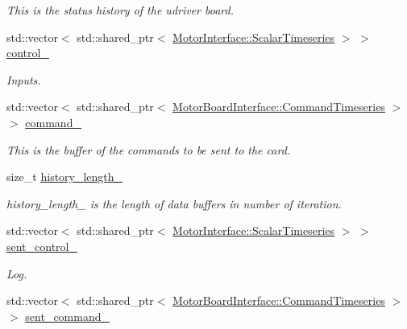 \begin{DoxyCompactItemize}
\begin{DoxyCompactList}\small\item\em This is the status history of the udriver board. \end{DoxyCompactList}\item 
std\+::vector$<$ std\+::shared\+\_\+ptr$<$ \hyperlink{classblmc__drivers_1_1MotorInterface_a49b8fc916b9f9debbd7b0988463db5cd}{Motor\+Interface\+::\+Scalar\+Timeseries} $>$ $>$ \hyperlink{classblmc__drivers_1_1SpiBus_a39d0629b2cb78b7aeae9a4022ca487ed}{control\+\_\+}
\begin{DoxyCompactList}\small\item\em Inputs. \end{DoxyCompactList}\item 
std\+::vector$<$ std\+::shared\+\_\+ptr$<$ \hyperlink{classblmc__drivers_1_1MotorBoardInterface_ae2afe94a023d9f08a4c689e9b7660f15}{Motor\+Board\+Interface\+::\+Command\+Timeseries} $>$ $>$ \hyperlink{classblmc__drivers_1_1SpiBus_a0dadae58644afb41beba8df8f9f09727}{command\+\_\+}\hypertarget{classblmc__drivers_1_1SpiBus_a0dadae58644afb41beba8df8f9f09727}{}\label{classblmc__drivers_1_1SpiBus_a0dadae58644afb41beba8df8f9f09727}

\begin{DoxyCompactList}\small\item\em This is the buffer of the commands to be sent to the card. \end{DoxyCompactList}\item 
size\+\_\+t \hyperlink{classblmc__drivers_1_1SpiBus_a8d0b70b8d02c386d436051a571930c58}{history\+\_\+length\+\_\+}\hypertarget{classblmc__drivers_1_1SpiBus_a8d0b70b8d02c386d436051a571930c58}{}\label{classblmc__drivers_1_1SpiBus_a8d0b70b8d02c386d436051a571930c58}

\begin{DoxyCompactList}\small\item\em history\+\_\+length\+\_\+ is the length of data buffers in number of iteration. \end{DoxyCompactList}\item 
std\+::vector$<$ std\+::shared\+\_\+ptr$<$ \hyperlink{classblmc__drivers_1_1MotorInterface_a49b8fc916b9f9debbd7b0988463db5cd}{Motor\+Interface\+::\+Scalar\+Timeseries} $>$ $>$ \hyperlink{classblmc__drivers_1_1SpiBus_a9c17b8887fc58ca1d5bfb1d5c2fd1e8a}{sent\+\_\+control\+\_\+}
\begin{DoxyCompactList}\small\item\em Log. \end{DoxyCompactList}\item 
std\+::vector$<$ std\+::shared\+\_\+ptr$<$ \hyperlink{classblmc__drivers_1_1MotorBoardInterface_ae2afe94a023d9f08a4c689e9b7660f15}{Motor\+Board\+Interface\+::\+Command\+Timeseries} $>$ $>$ \hyperlink{classblmc__drivers_1_1SpiBus_aa0e964e18db278c1d281d1406ff6d42a}{sent\+\_\+command\+\_\+}\hypertarget{classblmc__drivers_1_1SpiBus_aa0e964e18db278c1d281d1406ff6d42a}{}\label{classblmc__drivers_1_1SpiBus_aa0e964e18db278c1d281d1406ff6d42a}


\end{DoxyCompactItemize}
